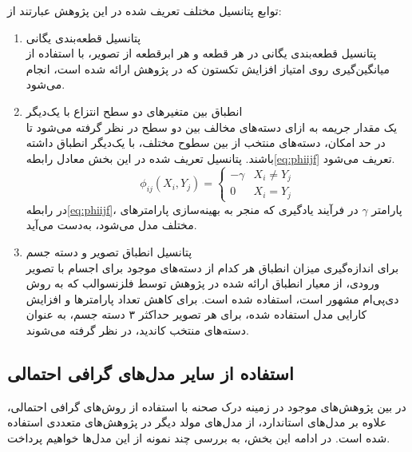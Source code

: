 توابع پتانسیل مختلف تعریف شده در این پژوهش عبارتند از:

\begin{enumerate}
	\item پتانسیل قطعه‌بندی یگانی\\
	پتانسیل قطعه‌بندی یگانی در هر قطعه و هر ابرقطعه از تصویر، با استفاده از میانگین‌گیری روی امتیاز افزایش تکستون که در پژوهش \cite{ladicky2010graph} ارائه شده است، انجام می‌شود.
	\item انطباق بین متغیرهای دو سطح انتزاع با یک‌دیگر\\
	یک مقدار جریمه به ازای دسته‌های مخالف بین دو سطح در نظر گرفته‌ می‌شود تا در حد امکان، دسته‌های منتخب از بین سطوح مختلف، با یک‌دیگر انطباق داشته باشند. پتانسیل تعریف شده در این بخش معادل رابطه\ref{eq:phiijf} 
	تعریف می‌شود.
	\begin{equation}
	\phi_{ij}(X_i, Y_j)=
	\left\{
	\begin{array}{ll}
	- \gamma		&	X_i \neq Y_j \\
	0			&	X_i	=	Y_j
	\end{array}							
	\right.
	\label{eq:phiijf}
	\end{equation}
	در رابطه\ref{eq:phiijf}، پارامتر $\gamma$ در فرآیند یادگیری که منجر به بهینه‌سازی پارامترهای مختلف مدل می‌شود، به‌دست می‌آید.
	\item پتانسیل انطباق تصویر و دسته جسم\\
	برای اندازه‌گیری میزان انطباق هر کدام از دسته‌های موجود برای اجسام با تصویر ورودی، از معیار انطباق ارائه شده در پژوهش\cite{felzenszwalb2010object}
	توسط فلزنسوالب که به روش دی‌پی‌ام مشهور است، استفاده شده است. برای کاهش تعداد پارامترها و افزایش کارایی مدل استفاده شده، برای هر تصویر حداکثر ۳ دسته جسم، به عنوان دسته‌های منتخب کاندید، در نظر گرفته می‌شوند.
\end{enumerate}


\subsection{استفاده از سایر مدل‌های گرافی احتمالی}
در بین پژوهش‌های موجود در زمینه درک صحنه با استفاده از روش‌های  گرافی احتمالی، علاوه بر مدل‌های استاندارد، از مدل‌های مولد دیگر در پژوهش‌های متعددی استفاده شده است. در ادامه این بخش، به بررسی چند‌ نمونه از این مدل‌ها خواهیم پرداخت.

